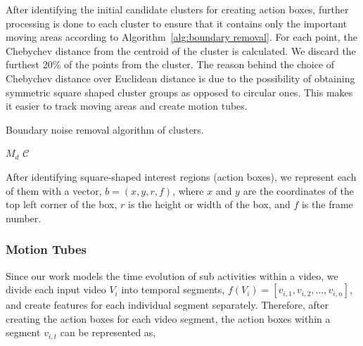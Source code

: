 After identifying the initial candidate clusters for creating action boxes, further processing is done to each cluster to ensure that it contains only the important moving areas according to Algorithm~\ref{alg:boundary removal}. For each point, the Chebychev distance from the centroid of the cluster is calculated. %
We discard the furthest 20\% of the points from the cluster. The reason behind the choice of Chebychev distance over Euclidean distance is due to the possibility of obtaining symmetric square shaped cluster groups as opposed to circular ones. This makes it easier to track moving areas and create motion tubes.


\begin{algorithm}
   \caption{Boundary noise removal algorithm of clusters.}
   \label{alg:boundary removal}
    \begin{algorithmic}[1]
    \Require $M_{d}$ 
    \Require $\mathcal{C}$ 
	  \EndIf
	\EndWhile


\end{algorithmic}
\end{algorithm}

After identifying square-shaped interest regions (action boxes), we represent each of them with a vector, $b = (x,y,r,f)$, where $x$ and $y$ are the coordinates
of the top left corner of the box, $r$ is the height or width of the box, and $f$ is the frame number.


\subsubsection{Motion Tubes}
Since our work models the time evolution of sub activities within a video, we divide each input video $V_{i}$ into temporal segments, $f(V_{i}) = [v_{i,1},
v_{i,2}, \dots, v_{i,n}]$,
and create features for each individual segment separately. Therefore, after creating the action boxes for each video segment,
the action boxes within a segment $v_{i,t}$ can be represented as,

